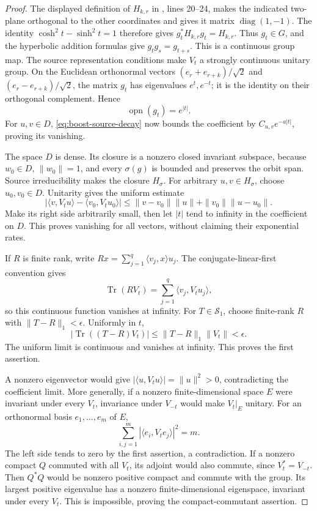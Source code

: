 \documentclass[11pt,a4paper]{article}
\newcommand{\Tr}{\operatorname{Tr}}
\begin{document}
\begin{proof}
The displayed definition of \(H_{k,r}\) in
, lines 20--24,
makes the indicated two-plane orthogonal to the other coordinates
and gives it matrix \(\operatorname{diag}(1,-1)\).
The identity \(\cosh^2t-\sinh^2t=1\) therefore gives
\(g_t^*H_{k,r}g_t=H_{k,r}\). Thus \(g_t\in G\), and the
hyperbolic addition formulas give \(g_tg_s=g_{t+s}\).
This is a continuous group map. The source representation
conditions make \(V_t\) a strongly continuous unitary group.
On the Euclidean orthonormal vectors
\((e_r+e_{r+k})/\sqrt2\) and
\((e_r-e_{r+k})/\sqrt2\), the matrix \(g_t\) has eigenvalues
\(e^t,e^{-t}\); it is the identity on their orthogonal
complement. Hence
\[
 \operatorname{opn}(g_t)=e^{|t|}.
\]
For \(u,v\in D\), \eqref{eq:boost-source-decay} now bounds the
coefficient by \(C_{u,v}e^{-a|t|}\), proving its vanishing.

The space \(D\) is dense. Its closure is a nonzero closed
invariant subspace, because \(w_0\in D\), \(\|w_0\|=1\),
and every \(\sigma(g)\) is bounded and preserves the orbit
span. Source irreducibility makes the closure \(H_\sigma\).
For arbitrary \(u,v\in H_\sigma\), choose \(u_0,v_0\in D\).
Unitarity gives the uniform estimate
\[
 |\langle v,V_tu\rangle-\langle v_0,V_tu_0\rangle|
 \le\|v-v_0\|\|u\|+\|v_0\|\|u-u_0\|.
\]
Make its right side arbitrarily small, then let \(|t|\) tend
to infinity in the coefficient on \(D\). This proves vanishing
for all vectors, without claiming their exponential rates.

If \(R\) is finite rank, write
\(Rx=\sum_{j=1}^q\langle v_j,x\rangle u_j\).
The conjugate-linear-first convention gives
\[
 \Tr(RV_t)=\sum_{j=1}^q\langle v_j,V_tu_j\rangle,
\]
so this continuous function vanishes at infinity.
For \(T\in\mathcal S_1\), choose finite-rank \(R\) with
\(\|T-R\|_1<\epsilon\). Uniformly in \(t\),
\[
 |\Tr((T-R)V_t)|\le\|T-R\|_1\|V_t\|<\epsilon.
\]
The uniform limit is continuous and vanishes at infinity.
This proves the first assertion.

A nonzero eigenvector would give
\(|\langle u,V_tu\rangle|=\|u\|^2>0\), contradicting the
coefficient limit. More generally, if a nonzero finite-dimensional
space \(E\) were invariant under every \(V_t\), invariance under
\(V_{-t}\) would make \(V_t|_E\) unitary. For an orthonormal
basis \(e_1,\ldots,e_m\) of \(E\),
\[
 \sum_{i,j=1}^m|\langle e_i,V_te_j\rangle|^2=m.
\]
The left side tends to zero by the first assertion, a
contradiction. If a nonzero compact \(Q\) commuted with all
\(V_t\), its adjoint would also commute, since \(V_t^*=V_{-t}\).
Then \(Q^*Q\) would be nonzero positive compact and commute
with the group. Its largest positive eigenvalue has a nonzero
finite-dimensional eigenspace, invariant under every \(V_t\).
This is impossible, proving the compact-commutant assertion.


\end{proof}
\end{document}
